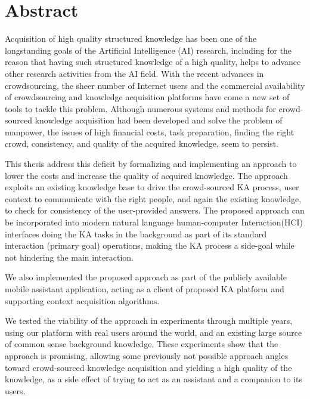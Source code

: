 % 
\chapter*{Abstract}
Acquisition of high quality structured knowledge has been one of the 
longstanding goals of the Artificial Intelligence (AI) research, including for 
the reason that having such structured knowledge of a high quality, helps to 
advance other research activities from the AI field. With the recent advances 
in crowdsourcing, the sheer number of Internet users and the commercial 
availability of crowdsourcing and knowledge acquisition platforms have come a 
new set of tools to tackle this problem. Although numerous systems and methods 
for crowd-sourced knowledge acquisition had been developed and solve the problem
of manpower, the issues of high financial costs, task preparation, finding 
the right crowd, consistency, and quality of the acquired knowledge, seem to 
persist. 

This thesis address this deficit by formalizing and implementing an approach
to lower the costs and increase the quality of acquired knowledge. The approach
exploits an existing knowledge base to drive the crowd-sourced KA process, 
user context to communicate with the right people, and again the existing
knowledge, to check for consistency of the user-provided answers. 
The proposed approach can be incorporated into modern natural language
human-computer Interaction(HCI) interfaces doing the KA tasks in the background
as part of its standard interaction (primary goal) operations, making the KA
process a side-goal while not hindering the main interaction. 

We also implemented the proposed approach as part of the publicly available 
mobile assistant application, acting as a client of proposed KA platform and 
supporting context acquisition algorithms.

We tested the viability of the approach in experiments through multiple years,
using our platform with real users around the world, and an existing large 
source of common sense background knowledge. These experiments show that the 
approach is promising, allowing some previously not possible approach angles 
toward crowd-sourced knowledge acquisition and yielding a high quality of the 
knowledge, as a side effect of trying to act as an assistant and a companion 
to its users.
